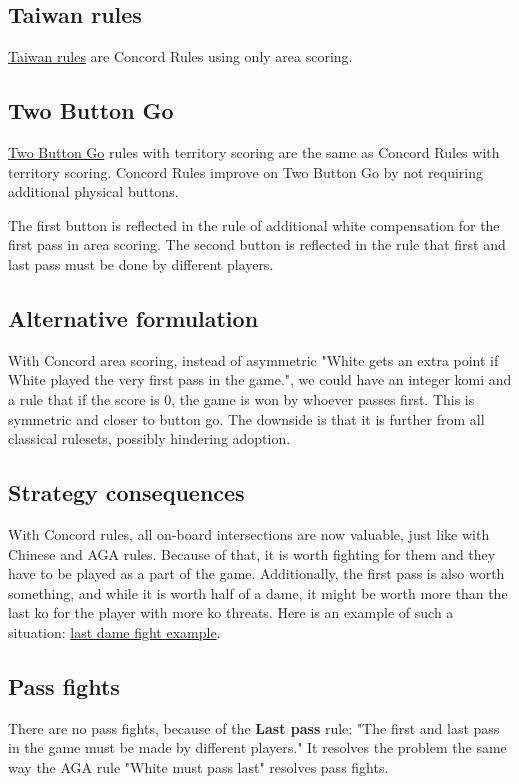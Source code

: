 \documentclass[11pt]{article}
\begin{document}
\subsection*{Taiwan rules}
\href{https://senseis.xmp.net/?TaiwanRules}{Taiwan rules} are Concord Rules using only area scoring.

\subsection*{Two Button Go}
\href{https://senseis.xmp.net/?TwoButtonGo}{Two Button Go} rules with territory scoring are the same as Concord Rules with territory scoring.
Concord Rules improve on Two Button Go by not requiring additional physical buttons.

The first button is reflected in the rule of additional white compensation for the first pass in area scoring.
The second button is reflected in the rule that first and last pass must be done by different players.

\subsection*{Alternative formulation}
With Concord area scoring, instead of asymmetric "White gets an extra point if White played the very first pass in the game.", we could have an integer komi and a rule that if the score is 0, the game is won by whoever passes first.
This is symmetric and closer to button go. The downside is that it is further from all classical rulesets, possibly hindering adoption.

\subsection*{Strategy consequences}
With Concord rules, all on-board intersections are now valuable, just like with Chinese and AGA rules.
Because of that, it is worth fighting for them and they have to be played as a part of the game.
Additionally, the first pass is also worth something, and while it is worth half of a dame, it might be worth more than the last ko for the player with more ko threats.
Here is an example of such a situation: \href{https://online-go.com/demo/1499043}{last dame fight example}.

\subsection*{Pass fights}
There are no pass fights, because of the \textbf{Last pass} rule: "The first and last pass in the game must be made by different players."
It resolves the problem the same way the AGA rule "White must pass last" resolves pass fights.
\end{document}
